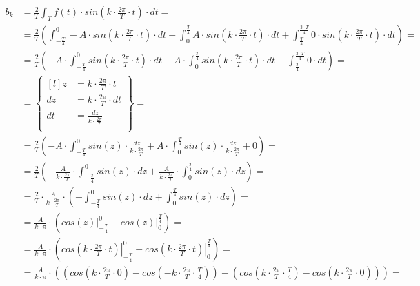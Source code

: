 \begin{task}
\begin{align*}
b_k&=\frac{2}{T}\int_{T}f(t) \cdot sin\left( k \cdot \frac{2\pi}{T} \cdot t\right) \cdot dt=\\
&=\frac{2}{T} \left(\int_{-\frac{T}{4}}^{0}-A \cdot sin\left( k \cdot \frac{2\pi}{T} \cdot t\right) \cdot dt 
+ \int_{0}^{\frac{T}{4}} A \cdot sin\left( k \cdot \frac{2\pi}{T} \cdot t\right) \cdot dt 
+ \int_{\frac{T}{4}}^{\frac{3\cdot T}{4}} 0 \cdot sin\left( k \cdot \frac{2\pi}{T} \cdot t\right) \cdot dt \right)=\\
&=\frac{2}{T} \left(-A \cdot \int_{-\frac{T}{4}}^{0} sin\left( k \cdot \frac{2\pi}{T} \cdot t\right) \cdot dt 
+  A \cdot \int_{0}^{\frac{T}{4}} sin\left( k \cdot \frac{2\pi}{T} \cdot t\right) \cdot dt 
+ \int_{\frac{T}{4}}^{\frac{3\cdot T}{4}} 0 \cdot dt \right)=\\
&=\begin{Bmatrix*}[l]
z&=k \cdot \frac{2\pi}{T} \cdot t \\
dz&=k \cdot \frac{2\pi}{T} \cdot dt \\
dt&=\frac{dz}{k \cdot \frac{2\pi}{T}} \\
\end{Bmatrix*}=\\
&=\frac{2}{T} \left(-A \cdot \int_{-\frac{T}{4}}^{0} sin\left( z \right) \cdot \frac{dz}{k \cdot \frac{2\pi}{T}}  
+  A \cdot \int_{0}^{\frac{T}{4}} sin\left( z \right) \cdot \frac{dz}{k \cdot \frac{2\pi}{T}}  
+ 0 \right)=\\
&=\frac{2}{T} \left(-\frac{A}{k \cdot \frac{2\pi}{T}} \cdot \int_{-\frac{T}{4}}^{0} sin\left( z \right) \cdot dz  
+  \frac{A}{k \cdot \frac{2\pi}{T}} \cdot \int_{0}^{\frac{T}{4}} sin\left( z \right) \cdot dz \right)=\\
&=\frac{2}{T} \cdot \frac{A}{k \cdot \frac{2\pi}{T}} \cdot \left(- \int_{-\frac{T}{4}}^{0} sin\left( z \right) \cdot dz  
+  \int_{0}^{\frac{T}{4}} sin\left( z \right) \cdot dz \right)=\\
&=\frac{A}{k \cdot \pi} \cdot \left(\left. cos\left( z \right) \right|_{-\frac{T}{4}}^{0} - \left. cos\left( z \right) \right|_{0}^{\frac{T}{4}} \right)=\\
&=\frac{A}{k \cdot \pi} \cdot \left(\left. cos\left( k \cdot \frac{2\pi}{T} \cdot t \right) \right|_{-\frac{T}{4}}^{0} - \left. cos\left( k \cdot \frac{2\pi}{T} \cdot t \right) \right|_{0}^{\frac{T}{4}} \right)=\\
&=\frac{A}{k \cdot \pi} \cdot \left(\left( cos\left( k \cdot \frac{2\pi}{T} \cdot 0 \right) - cos\left(- k \cdot \frac{2\pi}{T} \cdot \frac{T}{4} \right) \right) - \left( cos\left( k \cdot \frac{2\pi}{T} \cdot \frac{T}{4} \right) - cos\left( k \cdot \frac{2\pi}{T} \cdot 0 \right) \right) \right)=\\

\end{align*}
\end{task}
